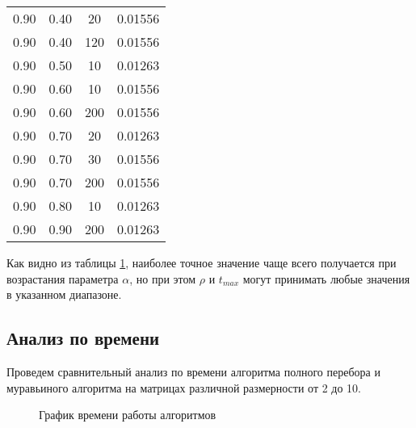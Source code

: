 \documentclass[a4paper, 14pt]{article}
\begin{document}
\begin{table}[H]
\begin{tabular}{ | c | c | c | c | }
0.90 & 0.40 &  20 & 0.01556 \\
0.90 & 0.40 & 120 & 0.01556 \\
0.90 & 0.50 &  10 & 0.01263 \\
0.90 & 0.60 &  10 & 0.01556 \\
0.90 & 0.60 & 200 & 0.01556 \\
0.90 & 0.70 &  20 & 0.01263 \\
0.90 & 0.70 &  30 & 0.01556 \\
0.90 & 0.70 & 200 & 0.01556 \\
0.90 & 0.80 &  10 & 0.01263 \\
0.90 & 0.90 & 200 & 0.01263 \\
                \hline
            \end{tabular}
        \label{tab:par}
    \end{table} 
    
    Как видно из таблицы \ref{tab:par}, наиболее точное значение чаще всего получается при возрастания параметра $\alpha$, но при этом $\rho$  и $t_{max}$ могут принимать любые значения в указанном диапазоне.
    
   \newpage
	\subsection{Анализ по времени}
	
	Проведем сравнительный анализ по времени алгоритма полного перебора и муравьиного алгоритма на матрицах различной размерности от 2 до 10.
	
\begin{figure}[H]
	\caption{График времени работы алгоритмов}
	\label{gr}
	\end{figure}
	
\end{document}
